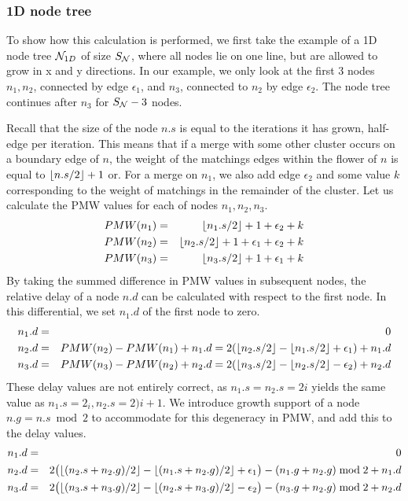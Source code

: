 \subsubsection{1D node tree}

To show how this calculation is performed, we first take the example of a 1D node tree $\mathcal{N}_{1D}$ of size $S_{\mathcal{N}}$, where all nodes lie on one line, but are allowed to grow in x and y directions. In our example, we only look at the first 3 nodes $n_1, n_2$, connected by edge $\epsilon_{1}$, and $n_3$, connected to $n_2$ by edge $\epsilon_{2}$. The node tree continues after $n_3$ for $S_{\mathcal{N}} - 3$ nodes.

Recall that the size of the node $n.s$ is equal to the iterations it has grown, half-edge per iteration. This means that if a merge with some other cluster occurs on a boundary edge of $n$, the weight of the matchings edges within the flower of $n$ is equal to ${\left \lfloor n.s/2 \right \rfloor }+1$ or. For a merge on $n_1$, we also add edge $\epsilon_2$ and some value $k$ corresponding to the weight of matchings in the remainder of the cluster. Let us calculate the PMW values for each of nodes $n_1, n_2, n_3$.
\begin{eqnarray*}
  PMW(n_1) &=& {\left \lfloor n_1.s/2 \right \rfloor }+1 + \epsilon_2 + k \\
  PMW(n_2) &=& {\left \lfloor n_2.s/2 \right \rfloor }+1 + \epsilon_1 + \epsilon_2 + k \\
  PMW(n_3) &=& {\left \lfloor n_3.s/2 \right \rfloor }+1 + \epsilon_1 +k
\end{eqnarray*}
By taking the summed difference in PMW values in subsequent nodes, the relative delay of a node $n.d$ can be calculated with respect to the first node. In this differential, we set $n_1.d$ of the first node to zero.
\begin{eqnarray*}
  n_1.d &=& 0 \\
  n_2.d &=& PMW(n_2) - PMW(n_1) + n_1.d = 2({\left \lfloor n_2.s/2 \right \rfloor } - {\left \lfloor n_1.s/2 \right \rfloor } + \epsilon_1) + n_1.d \\
  n_3.d &=& PMW(n_3) - PMW(n_2) + n_2.d = 2({\left \lfloor n_3.s/2 \right \rfloor } - {\left \lfloor n_2.s/2 \right \rfloor } - \epsilon_2) + n_2.d
\end{eqnarray*}
These delay values are not entirely correct, as $n_1.s = n_2.s = 2i$ yields the same value as  $n_1.s = 2_i,  n_2.s = 2)i + 1$. We introduce growth support of a node $n.g = n.s \bmod 2$ to accommodate for this degeneracy in PMW, and add this to the delay values.
\begin{eqnarray*}
  n_1.d &=& 0 \\
  n_2.d &=& 2\big({\left \lfloor (n_2.s+n_2.g)/2 \right \rfloor } - {\left \lfloor (n_1.s+n_2.g)/2 \right \rfloor } + \epsilon_1\big) - (n_1.g + n_2.g)\bmod 2 + n_1.d \\
  n_3.d &=& 2\big({\left \lfloor (n_3.s+n_3.g)/2 \right \rfloor } - {\left \lfloor (n_2.s+n_3.g)/2 \right \rfloor } - \epsilon_2\big) - (n_3.g + n_2.g)\bmod 2 + n_2.d
\end{eqnarray*}
